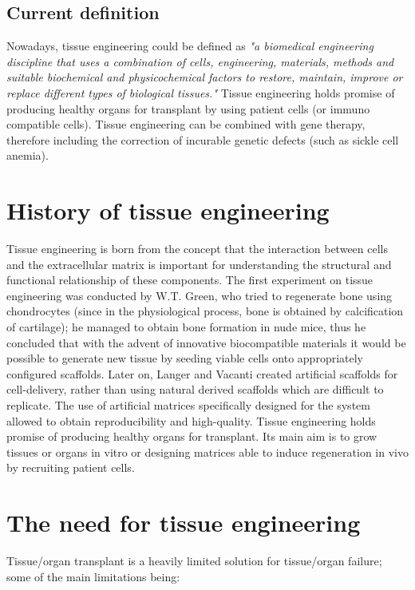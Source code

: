   \subsection{Current definition}
  Nowadays, tissue engineering could be defined as \textit{"a biomedical engineering discipline that uses a combination of cells, engineering, materials, methods and suitable biochemical and physicochemical factors to restore, maintain, improve or replace different types of biological tissues."}
  Tissue engineering holds promise of producing healthy organs for transplant by using patient cells (or immuno compatible cells). Tissue engineering can be combined with gene therapy, therefore including the correction of incurable genetic defects (such as sickle cell anemia).


\section{History of tissue engineering}
Tissue engineering is born from the concept that the interaction between cells and the extracellular matrix is important for understanding the structural and functional relationship of these components.
The first experiment on tissue engineering was conducted by W.T. Green, who tried to regenerate bone using chondrocytes (since in the physiological process, bone is obtained by calcification of cartilage); he managed to obtain bone formation in nude mice, thus he concluded that with the advent of innovative biocompatible materials it would be possible to generate new tissue by seeding viable cells onto appropriately configured scaffolds.
Later on, Langer and Vacanti created artificial scaffolds for cell-delivery, rather than using natural derived scaffolds which are difficult to replicate. The use of artificial matrices specifically designed for the system allowed to obtain reproducibility and high-quality.
Tissue engineering holds promise of producing healthy organs for transplant.
Its main aim is to grow tissues or organs in vitro or designing matrices able to induce regeneration in vivo by recruiting patient cells.

\section{The need for tissue engineering}
Tissue/organ transplant is a heavily limited solution for tissue/organ failure; some of the main limitations being:

